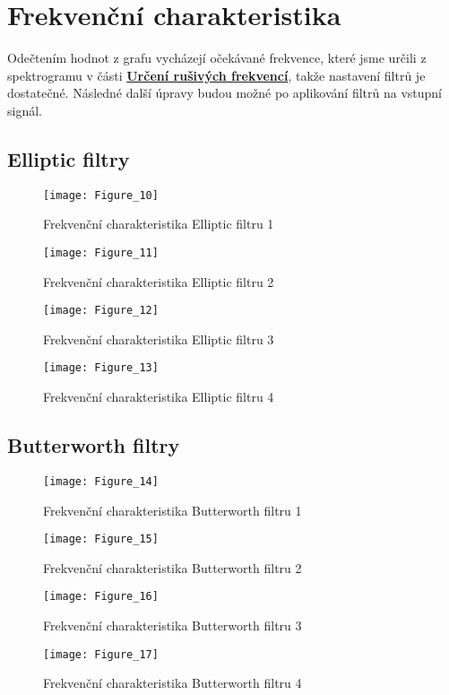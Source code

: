 \section{Frekvenční charakteristika}

Odečtením hodnot z grafu vycházejí očekávané frekvence, které jsme určili z spektrogramu v části \hyperref[sec:noise_freq]{\textbf{Určení rušivých frekvencí}}, takže nastavení filtrů je dostatečné.
Následné další úpravy budou možné po aplikování filtrů na vstupní signál.

\subsection{Elliptic filtry}
\begin{figure}[H] 
	\centering
	\texttt{[image: Figure\_10]}
	\caption{Frekvenční charakteristika Elliptic filtru 1}
\end{figure}

\begin{figure}[H] 
	\centering
	\texttt{[image: Figure\_11]}
	\caption{Frekvenční charakteristika Elliptic filtru 2}
\end{figure}

\begin{figure}[H] 
	\centering
	\texttt{[image: Figure\_12]}
	\caption{Frekvenční charakteristika Elliptic filtru 3}
\end{figure}

\begin{figure}[H] 
	\centering
	\texttt{[image: Figure\_13]}
	\caption{Frekvenční charakteristika Elliptic filtru 4}
\end{figure}

\subsection{Butterworth filtry}
\begin{figure}[H] 
	\centering
	\texttt{[image: Figure\_14]}
	\caption{Frekvenční charakteristika Butterworth filtru 1}
\end{figure}

\begin{figure}[H] 
	\centering
	\texttt{[image: Figure\_15]}
	\caption{Frekvenční charakteristika Butterworth filtru 2}
\end{figure}

\begin{figure}[H] 
	\centering
	\texttt{[image: Figure\_16]}
	\caption{Frekvenční charakteristika Butterworth filtru 3}
\end{figure}

\begin{figure}[H] 
	\centering
	\texttt{[image: Figure\_17]}
	\caption{Frekvenční charakteristika Butterworth filtru 4}
\end{figure}